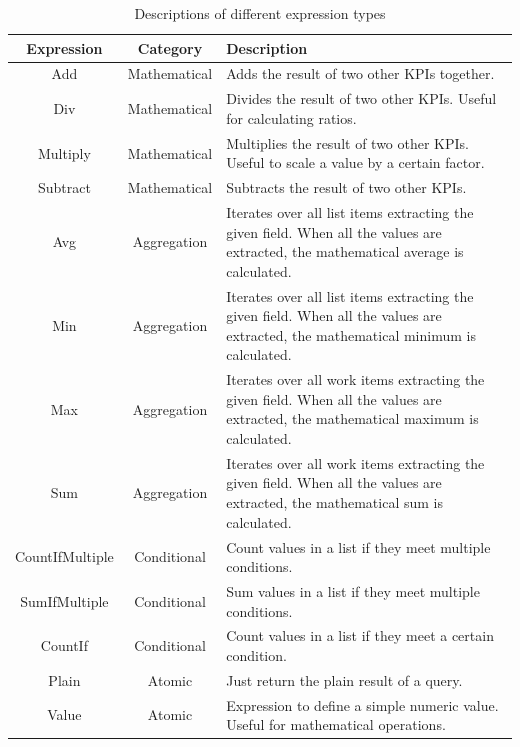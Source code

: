 \begin{table}[!h]
    \centering
    \begin{tabular}{c c p{8cm}}
    \hline
    \textbf{Expression} & \textbf{Category} & \textbf{Description} \\
    \hline
    Add & Mathematical & Adds the result of two other KPIs together. \\
    \hline
    Div & Mathematical & Divides the result of two other KPIs. Useful for calculating ratios. \\
    \hline
    Multiply & Mathematical & Multiplies the result of two other KPIs. Useful to scale a value by a certain factor. \\
    \hline
    Subtract & Mathematical & Subtracts the result of two other KPIs. \\
    \hline
    Avg & Aggregation & Iterates over all list items extracting the given field. When all the values are extracted, the mathematical average is calculated. \\
    \hline
    Min & Aggregation & Iterates over all list items extracting the given field. When all the values are extracted, the mathematical minimum is calculated. \\
    \hline
    Max & Aggregation & Iterates over all work items extracting the given field. When all the values are extracted, the mathematical maximum is calculated. \\
    \hline
    Sum & Aggregation & Iterates over all work items extracting the given field. When all the values are extracted, the mathematical sum is calculated. \\
    \hline
    CountIfMultiple & Conditional & Count values in a list if they meet multiple conditions. \\
    \hline
    SumIfMultiple & Conditional & Sum values in a list if they meet multiple conditions. \\
    \hline
    CountIf & Conditional & Count values in a list if they meet a certain condition. \\
    \hline
    Plain & Atomic & Just return the plain result of a query. \\
    \hline
    Value & Atomic & Expression to define a simple numeric value. Useful for mathematical operations. \\
    \end{tabular}
    \caption{Descriptions of different expression types}
    \label{tab:expression-types}
\end{table}


